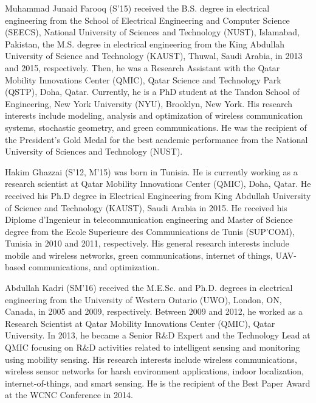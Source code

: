 \documentclass[10pt, letter,twocolumn]{IEEEtran}
\begin{document}
\begin{IEEEbiography}{Muhammad Junaid Farooq} (S'15) received the B.S. degree in electrical engineering from the School of Electrical Engineering and Computer Science (SEECS), National University of Sciences and Technology (NUST), Islamabad, Pakistan, the M.S. degree in electrical engineering from the King Abdullah University of Science and Technology (KAUST), Thuwal, Saudi Arabia, in 2013 and 2015, respectively. Then, he was a Research Assistant with the Qatar Mobility Innovations Center (QMIC), Qatar Science and Technology Park (QSTP), Doha, Qatar. Currently, he is a PhD student at the Tandon School of Engineering, New York University (NYU), Brooklyn, New York. His research interests include modeling, analysis and optimization of wireless communication systems, stochastic geometry, and green communications. He was the recipient of the President's Gold Medal for the best academic performance from the National University of Sciences and Technology (NUST).
\end{IEEEbiography}



\begin{IEEEbiography}{Hakim Ghazzai} (S'12, M'15)
was born in Tunisia. He is currently working as a research scientist at Qatar Mobility Innovations Center (QMIC), Doha, Qatar. He received his Ph.D degree in Electrical Engineering from King Abdullah University of Science and Technology (KAUST), Saudi Arabia in 2015. He received his Diplome d'Ingenieur in telecommunication engineering and Master of Science degree from the Ecole Superieure des Communications de Tunis (SUP'COM), Tunisia in 2010 and 2011, respectively. His general research interests include mobile and wireless networks, green communications, internet of things, UAV-based communications, and optimization.
\end{IEEEbiography}



\begin{IEEEbiography}{Abdullah Kadri} (SM'16)
received the M.E.Sc. and Ph.D. degrees in electrical engineering from the University of Western Ontario (UWO), London, ON, Canada, in 2005 and 2009, respectively. Between 2009 and 2012, he worked as a Research Scientist at Qatar Mobility Innovations Center (QMIC), Qatar University. In 2013, he became a Senior R$\&$D Expert and the Technology Lead at QMIC focusing on R$\&$D activities related to intelligent sensing and monitoring using mobility sensing. His research interests include wireless communications, wireless sensor networks for harsh environment applications, indoor localization, internet-of-things, and smart sensing. He is the recipient of the Best Paper Award at the WCNC Conference in 2014.
\end{IEEEbiography}
\end{document}
